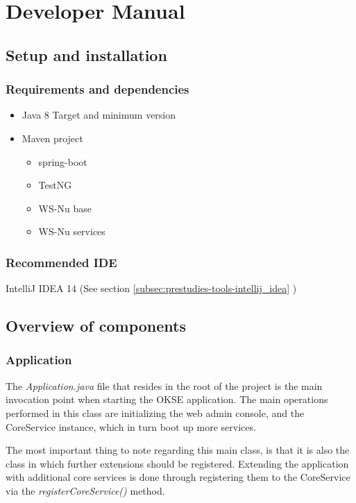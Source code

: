 \chapter{Developer Manual}

\section{Setup and installation}

\subsection{Requirements and dependencies}

\begin{itemize}
\item Java 8 Target and minimum version
\item Maven project \begin{itemize}
    \item spring-boot 
    \item TestNG
    \item WS-Nu base
    \item WS-Nu services
\end{itemize}
\end{itemize}

\subsection{Recommended IDE}

IntelliJ IDEA 14 (See section \ref{subsec:prestudies-tools-intellij_idea} )

\section{Overview of components}

\subsection{Application}

The \textit{Application.java} file that resides in the root of the project is the main invocation point when starting the OKSE application. The main operations performed in this class are initializing the web admin console, and the CoreService instance, which in turn boot up more services.

The most important thing to note regarding this main class, is that it is also the class in which further extensions should be registered. Extending the application with additional core services is done through registering them to the CoreService via the \textit{registerCoreService()} method.

